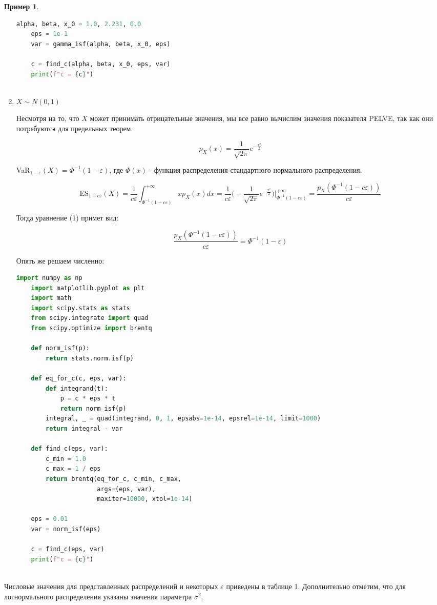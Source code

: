 \documentclass[12pt]{article}
\theoremstyle{plain}
\theoremstyle{definition}
\newtheorem{example}{Пример}[section]
\theoremstyle{remark}
\begin{document}
\begin{example}
\begin{enumerate}
\begin{lstlisting}[language=Python, gobble = 4]
    alpha, beta, x_0 = 1.0, 2.231, 0.0
    eps = 1e-1
    var = gamma_isf(alpha, beta, x_0, eps)
    
    c = find_c(alpha, beta, x_0, eps, var)
    print(f"c = {c}")
    
    \end{lstlisting}

    \item $X \sim N(0,1)$

    Несмотря на то, что $X$ может принимать отрицательные значения, мы все равно вычислим значения показателя PELVE, так как они потребуются для предельных теорем.

    \[p_X(x)=\frac{1}{\sqrt{2\pi}}e^{-\frac{x^2}{2}}\]

    VaR$_{1-\varepsilon}(X) = \Phi^{-1}(1-\varepsilon)$, где $\Phi(x)$ - функция распределения стандартного нормального распределения.

    \[
        \text{ES}_{1-c\varepsilon}(X) = \frac{1}{c\varepsilon}\int_{\Phi^{-1}(1-c\varepsilon)}^{+\infty}xp_X(x)dx = \frac{1}{c\varepsilon}\bigg(-\frac{1}{\sqrt{2\pi}}e^{-\frac{x^2}{2}}\bigg)\bigg|^{+\infty}_{\Phi^{-1}(1-c\varepsilon)} = \frac{p_X(\Phi^{-1}(1-c\varepsilon))}{c\varepsilon}
    \]

    Тогда уравнение (1) примет вид:

    \[
        \frac{p_X(\Phi^{-1}(1-c\varepsilon))}{c\varepsilon} = \Phi^{-1}(1-\varepsilon)
    \]

    Опять же решаем численно:

    \begin{lstlisting}[language=Python, gobble = 4]
    import numpy as np
    import matplotlib.pyplot as plt
    import math
    import scipy.stats as stats
    from scipy.integrate import quad
    from scipy.optimize import brentq
    
    def norm_isf(p):
        return stats.norm.isf(p)
    
    def eq_for_c(c, eps, var):
        def integrand(t):
            p = c * eps * t
            return norm_isf(p)
        integral, _ = quad(integrand, 0, 1, epsabs=1e-14, epsrel=1e-14, limit=1000)
        return integral - var
    
    def find_c(eps, var):
        c_min = 1.0
        c_max = 1 / eps  
        return brentq(eq_for_c, c_min, c_max,
                      args=(eps, var),
                      maxiter=10000, xtol=1e-14)
    
    eps = 0.01
    var = norm_isf(eps)
    
    c = find_c(eps, var)
    print(f"c = {c}")
    
    \end{lstlisting}
    
  
\end{enumerate}

Числовые значения для представленных распределений и некоторых $\varepsilon$ приведены в таблице 1. Дополнительно отметим, что для логнормального распределения указаны значения параметра $\sigma^2$.
\end{example}
\end{document}
